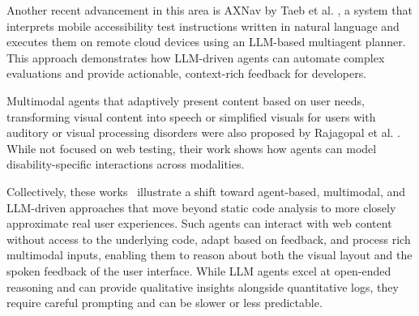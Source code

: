 Another recent advancement in this area is AXNav by Taeb et al. \cite{taeb2024axnav}, a system that interprets mobile accessibility test instructions written in natural language and executes them on remote cloud devices using an LLM-based multiagent planner. This approach demonstrates how LLM-driven agents can automate complex evaluations and provide actionable, context-rich feedback for developers.

Multimodal agents that adaptively present content based on user needs, transforming visual content into speech or simplified visuals for users with auditory or visual processing disorders were also proposed by Rajagopal et al. \cite{rajagopal2023design}. While not focused on web testing, their work shows how agents can model disability-specific interactions across modalities.

Collectively, these works~\cite{lanham2025ai, wang2024survey, lu2025uxagent} illustrate a shift toward agent-based, multimodal, and LLM-driven approaches that move beyond static code analysis to more closely approximate real user experiences. Such agents can interact with web content without access to the underlying code, adapt based on feedback, and process rich multimodal inputs, enabling them to reason about both the visual layout and the spoken feedback of the user interface. While LLM agents excel at open-ended reasoning and can provide qualitative insights alongside quantitative logs, they require careful prompting and can be slower or less predictable.

